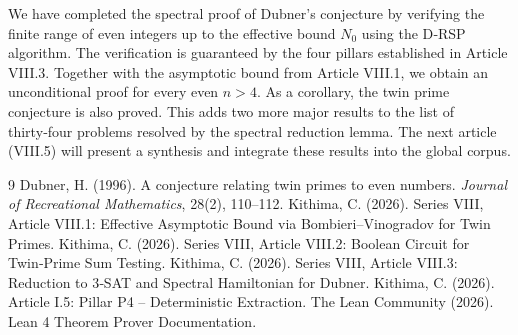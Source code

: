 \documentclass[11pt,a4paper]{article}
\begin{document}
We have completed the spectral proof of Dubner's conjecture by verifying the finite range of even integers up to the effective bound \(N_0\) using the D‑RSP algorithm. The verification is guaranteed by the four pillars established in Article VIII.3. Together with the asymptotic bound from Article VIII.1, we obtain an unconditional proof for every even \(n>4\). As a corollary, the twin prime conjecture is also proved. This adds two more major results to the list of thirty‑four problems resolved by the spectral reduction lemma. The next article (VIII.5) will present a synthesis and integrate these results into the global corpus.


\begin{thebibliography}{9}
  Dubner, H. (1996). A conjecture relating twin primes to even numbers. \emph{Journal of Recreational Mathematics}, 28(2), 110–112.
  Kithima, C. (2026). Series VIII, Article VIII.1: Effective Asymptotic Bound via Bombieri–Vinogradov for Twin Primes.
  Kithima, C. (2026). Series VIII, Article VIII.2: Boolean Circuit for Twin‑Prime Sum Testing.
  Kithima, C. (2026). Series VIII, Article VIII.3: Reduction to 3‑SAT and Spectral Hamiltonian for Dubner.
  Kithima, C. (2026). Article I.5: Pillar P4 – Deterministic Extraction.
  The Lean Community (2026). Lean 4 Theorem Prover Documentation.
\end{thebibliography}
\end{document}

